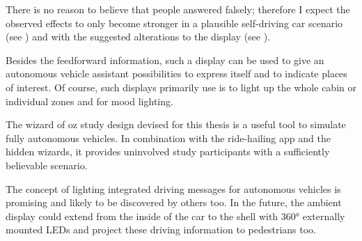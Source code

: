 There is no reason to believe that people answered falsely; therefore I expect the observed effects to only become stronger in a plausible self-driving car scenario (see \emph{}) and with the suggested alterations to the display (see \emph{}).

Besides the feedforward information, such a display can be used to give an autonomous vehicle assistant possibilities to express itself and to indicate places of interest. Of course, such displays primarily use is to light up the whole cabin or individual zones and for mood lighting. 

The wizard of oz study design devised for this thesis is a useful tool to simulate fully autonomous vehicles. In combination with the ride-hailing app and the hidden wizards, it provides uninvolved study participants with a sufficiently believable scenario. 

The concept of lighting integrated driving messages for autonomous vehicles is promising and likely to be discovered by others too. In the future, the ambient display could extend from the inside of the car to the shell with 360° externally mounted LEDs and project these driving information to pedestrians too. 